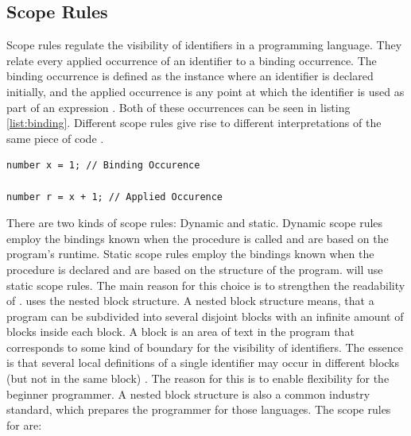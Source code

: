 \subsection{Scope Rules} \label{sec:scope_rules}
Scope rules regulate the visibility of identifiers in a programming language. They relate every applied occurrence of an identifier to a binding occurrence. The binding occurrence is defined as the instance where an identifier is declared initially, and the applied occurrence is any point at which the identifier is used as part of an expression \cite{craftingcompiler}. Both of these occurrences can be seen in listing \ref{list:binding}. Different scope rules give rise to different interpretations of the same piece of code \cite{transtrees}. 

\begin{lstlisting}[language = scriptkid, label={list:binding},caption=Example of a binding occurence and an applied occurence of the identifier \textit{x} in \lang]
number x = 1; // Binding Occurence

number r = x + 1; // Applied Occurence
\end{lstlisting}

\noindent
There are two kinds of scope rules: Dynamic and static. Dynamic scope rules employ the bindings known when the procedure is called and are based on the program's runtime. Static scope rules employ the bindings known when the procedure is declared and are based on the structure of the program\cite{transtrees}. \lang will use static scope rules. The main reason for this choice is to strengthen the readability of \lang. \lang uses the nested block structure. A nested block structure means, that a program can be subdivided into several disjoint blocks with an infinite amount of blocks inside each block. A block is an area of text in the program that corresponds to some kind of boundary for the visibility of identifiers. The essence is that several local definitions of a single identifier may occur in different blocks (but not in the same block) \cite{craftingcompiler}.
The reason for this is to enable flexibility for the beginner programmer. A nested block structure is also a common industry standard, which prepares the programmer for those languages. The scope rules for \lang are:

